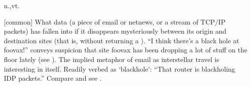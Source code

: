  n.,vt.

[common] What data (a piece of email or netnews, or a stream of TCP/IP packets)
has fallen into if it disappears mysteriously between its origin and destination
sites (that is, without returning a ). ``I think
there's a black hole at foovax!'' conveys suspicion that site foovax has been
dropping a lot of stuff on the floor lately (see ). The
implied metaphor of email as interstellar travel is interesting in itself.
Readily verbed as `blackhole': ``That router is blackholing IDP packets.''
Compare  and see .

